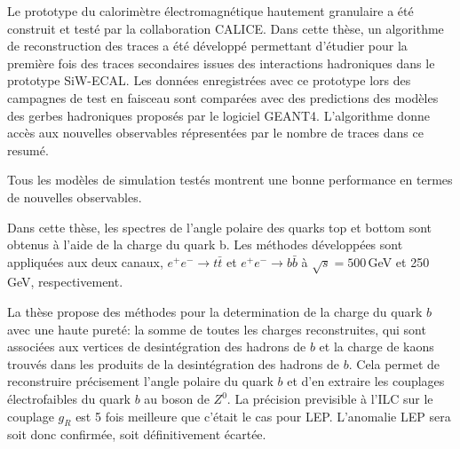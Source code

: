 Le prototype du calorim\`etre \'electromagn\'etique hautement granulaire a été construit et testé par la collaboration CALICE.
Dans cette thèse, un algorithme de reconstruction des traces a été développé permettant d'étudier pour la première fois des traces secondaires issues des interactions hadroniques dans le prototype SiW-ECAL.
Les données enregistrées avec ce prototype lors des campagnes de test en faisceau sont comparées avec des predictions des modèles des gerbes hadroniques proposés par le logiciel GEANT4. L'algorithme donne accès aux nouvelles observables répresentées par le nombre de traces dans ce resumé. 


Tous les modèles de simulation testés montrent une bonne performance en termes de nouvelles observables.

Dans cette thèse, les spectres de l'angle polaire des quarks top et bottom sont obtenus à l'aide de la charge du quark b.  
Les méthodes développées sont appliquées aux deux canaux, $e^+ e^- \to t\bar{t}$ et $e^+ e^- \to b\bar{b}$ à $\sqrt {s} = 500$\,GeV et 250\,GeV, respectivement.

La thèse propose des méthodes pour la determination de la charge du quark $b$ avec une haute pureté: la somme de toutes les charges reconstruites, qui sont associées aux vertices de desintégration des hadrons de $b$ et la charge de kaons trouvés dans les produits de la desintégration des hadrons de $b$. 
Cela permet de reconstruire précisement l'angle polaire du quark $b$ et d'en extraire les couplages électrofaibles du quark $b$ au boson de $Z^0$. %
La précision previsible à l'ILC sur le couplage $g_R$ est 5 fois meilleure que c'\'etait le cas pour LEP. L'anomalie LEP sera soit donc confirmée, soit définitivement écartée.



